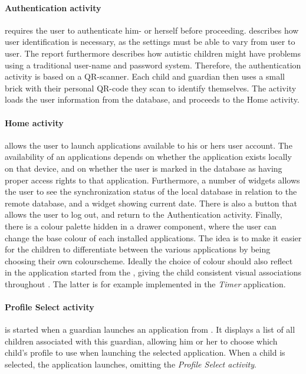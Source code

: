 \paragraph{Authentication activity} requires the user to authenticate him- or herself before proceeding. 
\citet{launcher2012} describes how user identification is necessary, as the \giraf settings must be able to vary from user to user. 
The report furthermore describes how autistic children might have problems using a traditional user-name and password system. 
Therefore, the authentication activity is based on a QR-scanner.
Each child and guardian then uses a small brick with their personal QR-code they scan to identify themselves. 
The activity loads the user information from the database, and proceeds to the Home activity.

\paragraph{Home activity} allows the user to launch \giraf applications available to his or hers user account. 
The availability of an applications depends on whether the application exists locally on that device, and on whether the user is marked in the database as having proper access rights to that application. 
Furthermore, a number of widgets allows the user to see the synchronization status of the local database in relation to the remote database, and a widget showing current date. 
There is also a button that allows the user to log out, and return to the Authentication activity.
Finally, there is a colour palette hidden in a drawer component, where the user can change the base colour of each installed applications. 
The idea is to make it easier for the children to differentiate between the various applications by being choosing their own colourscheme. 
Ideally the choice of colour should also reflect in the application started from the \launcher, giving the child consistent visual associations throughout \giraf.
The latter is for example implemented in the \textit{Timer} application.

\paragraph{Profile Select activity} is started when a guardian launches an application from \launcher. 
It displays a list of all children associated with this guardian, allowing him or her to choose which child's profile to use when launching the selected application. 
When a child is selected, the application launches, omitting the \textit{Profile Select activity}.